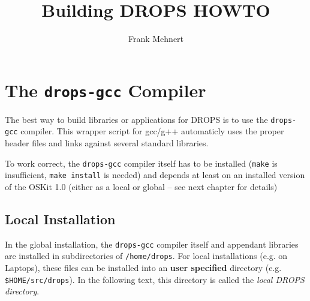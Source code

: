 \documentclass[twocolumn,10pt]{article}
\title{Building DROPS HOWTO}
\author{Frank Mehnert}
\date{}
\begin{document}
\maketitle


\section{The \texttt{drops-gcc} Compiler}
The best way to build libraries or applications for DROPS is to use
the \texttt{drops-gcc} compiler. This wrapper script for gcc/g++
automaticly uses the proper header files and links against several
standard libraries.

To work correct, the \texttt{drops-gcc} compiler itself has to be
installed (\texttt{make} is insufficient, \texttt{make install} is
needed) and depends at least on an installed version of the OSKit 1.0
(either as a local or global -- see next chapter for details)


\subsection{Local Installation}
In the global installation, the \texttt{drops-gcc} compiler itself
and appendant libraries are installed in subdirectories of 
\texttt{/home/drops}. For local installations (e.g. on Laptops),
these files can be installed into an \textbf{user specified}
directory (e.g. \texttt{\$HOME/src/drops}). In the following text,
this directory is called the \textsl{local DROPS directory}.
\end{document}
